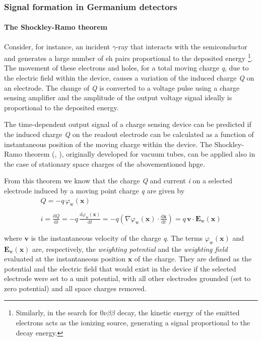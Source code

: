 \subsubsection{Signal formation in Germanium detectors}
\paragraph{The Shockley-Ramo theorem}
Consider, for instance, an incident $\gamma$-ray that interacts with the semiconductor and generates a large number of \ac{eh} pairs proportional to the deposited energy \footnote{Similarly, in the search for $0\nu\beta\beta$ decay, the kinetic energy of the emitted electrons acts as the ionizing source, generating a signal proportional to the decay energy.}. The movement of these electrons and holes, for a total moving charge \textit{q}, due to the electric field within the device, causes a variation of the induced charge \textit{Q} on an electrode. The change of \textit{Q} is converted to a voltage pulse using a charge sensing amplifier and the amplitude of the output voltage signal ideally is proportional to the deposited energy.

The time-dependent output signal of a charge sensing device can be predicted if the induced charge \textit{Q} on the readout electrode can be calculated as a function of instantaneous position of the moving charge  within the device. The Shockley-Ramo theorem (\cite{Shockley}, \cite{Ramo}), originally developed for vacuum tubes, can be applied also in the case of stationary space charges of the abovementioned \ac{hpge}. 

From this theorem we know that the charge \textit{Q} and current \textit{i} on a selected electrode induced by a moving point charge \textit{q} are given by
\begin{equation}
    \label{eq:carica-corrente-SR}
    \begin{gathered}
        Q = - q \, \varphi_\text{w} (\mathbf{x}) \\~\\
        i = \frac{\text{d}Q}{\text{d}t} = -q \, \frac{\text{d}\varphi_\text{w} (\mathbf{x})}{\text{d}t} = -q \left( \nabla \varphi_\text{w}(\mathbf{x}) \cdot \frac{\text{d}\mathbf{x}}{\text{d}t} \right) = q \, \mathbf{v} \cdot \mathbf{E}_\text{w}(\mathbf{x})
    \end{gathered}
\end{equation}

where $\mathbf{v}$ is the instantaneous velocity of the charge \textit{q}. The terms $\varphi_\text{w}(\mathbf{x})$ and $\mathbf{E}_\text{w}(\mathbf{x})$ are, respectively, the \textit{weighting potential} and the \textit{weighting field} evaluated at the instantaneous position $\mathbf{x}$ of the charge. They are defined as the potential and the electric field that would exist in the device if the selected electrode were set to a unit potential, with all other electrodes grounded (set to zero potential) and all space charges removed. \cite{GeDetectors}


